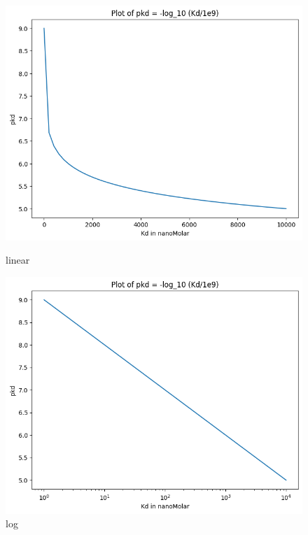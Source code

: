\documentclass[11pt, a4paper]{article}
\begin{document}
            \begin{figure}[H]
                \centering
                \begin{minipage}{0.45\textwidth}
                \includegraphics[width=\textwidth]{davis/linear pkd.png}
                \caption{linear}
                \end{minipage}
                \hfill
                \begin{minipage}{0.45\textwidth}
                \includegraphics[width=\textwidth]{davis/log pkd.png}
                \caption{log}
                \end{minipage}
            \end{figure}
\end{document}
